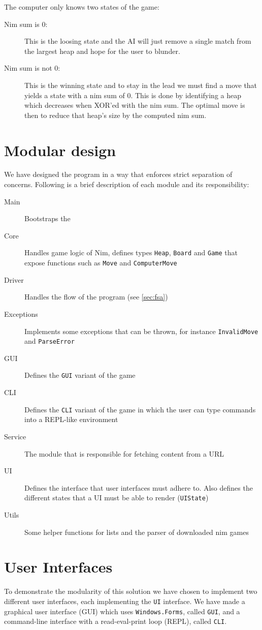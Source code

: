 \documentclass{article}
\begin{document}
The computer only knows two states of the game:
\begin{description}
\item[Nim sum is $0$:] This is the loosing state and the AI will just remove a single match from the largest heap and hope for the user to blunder.

\item[Nim sum is not $0$:] This is the winning state and to stay in the lead we must find a move that yields a state with a nim sum of $0$. This is done by identifying a heap which decreases when XOR'ed with the nim sum. The optimal move is then to reduce that heap's size by the computed nim sum.
\end{description}

\section{Modular design}
We have designed the program in a way that enforces strict separation of concerns. Following is a brief description of each module and its responsibility:


\begin{description}
\item[Main] Bootstraps the
\item[Core] Handles game logic of Nim, defines types \texttt{Heap}, \texttt{Board} and \texttt{Game} that expose functions such as \texttt{Move} and \texttt{ComputerMove}
\item[Driver] Handles the flow of the program (see \ref{sec:fsa})
\item[Exceptions] Implements some exceptions that can be thrown, for instance \texttt{InvalidMove} and \texttt{ParseError}
\item[GUI] Defines the \texttt{GUI} variant of the game
\item[CLI] Defines the \texttt{CLI} variant of the game in which the user can type commands into a REPL-like environment
\item[Service] The module that is responsible for fetching content from a URL
\item[UI] Defines the interface that user interfaces must adhere to. Also defines the different states that a UI must be able to render (\texttt{UIState})
\item[Utils] Some helper functions for lists and the parser of downloaded nim games
\end{description}

\section{User Interfaces}
To demonstrate the modularity of this solution we have chosen to implement two different user interfaces, each implementing the {\tt UI} interface. We have made a graphical user interface (GUI) which uses {\tt Windows.Forms}, called {\tt GUI}, and a command-line interface with a read-eval-print loop (REPL), called {\tt CLI}.
\end{document}
